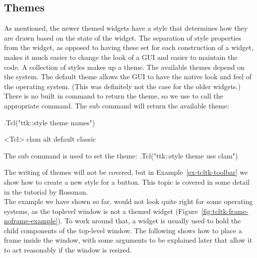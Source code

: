 \subsection{Themes}
\label{sec:tcltk:overview:themes}


As mentioned, the newer themed widgets have a style that determines
how they are drawn based on the state of the widget. The separation of
style properties from the widget, as opposed to having these set for
each construction of a widget, makes it much easier to change the look
of a GUI and easier to maintain the code. A collection of styles makes
up a theme. The available themes depend on the system. The default
theme allows the GUI to have the native look and feel of the operating
system. (This was definitely not the case for the older \TK\/
widgets.) There is no built in command to return the theme, so we use
 to call the appropriate \TCL\/ command. The 
sub command will return the available theme:

\begin{Schunk}
\begin{Sinput}
 .Tcl("ttk::style theme names")
\end{Sinput}
\begin{Soutput}
<Tcl> clam alt default classic 
\end{Soutput}
\end{Schunk}
%
The  sub command is used to set the theme:
.Tcl("ttk::style theme use clam")

The writing of themes will not be covered, but in
Example~\ref{ex-tcltk-toolbar} we show how to create a new style for a
button. This topic is covered in some detail in the \Tk\/ tutorial by Rossman.
\\

The example we have shown so far, would not look quite right for some
operating systems, as the toplevel window is not a themed widget
(Figure~\ref{fig:tcltk-frame-noframe-example}). To work around that, a
 widget is usually used to hold the child
components of the top-level window. The following shows how to place a
frame inside the window, with some arguments to be explained later
that allow it to act reasonably if the window is resized.


